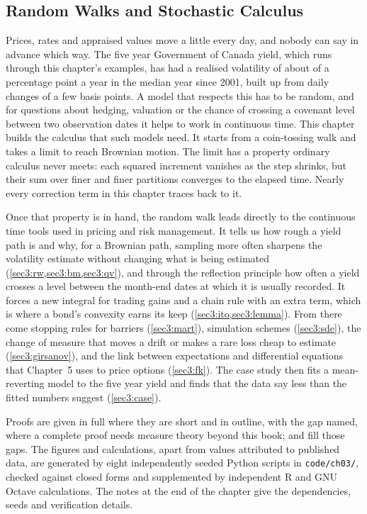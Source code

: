 
\begin{chapterrefs}
\setcounter{chapter}{2}
\chapter{Random Walks and Stochastic Calculus}
\label{ch:stochastic}

Prices, rates and appraised values move a little every day, and nobody can say in advance which way.
The five year Government of Canada yield, which runs through this chapter's examples, has had a
realised volatility of about \canRvDailyMed{} of a percentage point a year in the median year since
2001, built up from daily changes of a few basis points. A model that respects this has to be random, and for questions about hedging, valuation
or the chance of crossing a covenant level between two observation dates it helps to work in
continuous time. This chapter builds the calculus that such models need. It starts from a
coin-tossing walk and takes a limit to reach Brownian motion. The limit has a property ordinary
calculus never meets: each squared increment vanishes as the step shrinks, but their sum over finer
and finer partitions converges to the elapsed time. Nearly every correction term in this chapter traces back to it.

Once that property is in hand, the random walk leads directly to the continuous time tools used in pricing and risk management.
It tells us how rough a yield path is and why, for a Brownian path, sampling more often sharpens the
volatility estimate without changing what is being estimated
(\cref{sec3:rw,sec3:bm,sec3:qv}), and through the reflection principle how often a yield crosses a
level between the month-end dates at which it is usually recorded. It forces a new integral for trading gains and a chain rule with
an extra term, which is where a bond's convexity earns its keep (\cref{sec3:ito,sec3:lemma}). From
there come stopping rules for barriers (\cref{sec3:mart}), simulation schemes (\cref{sec3:sde}), the
change of measure that moves a drift or makes a rare loss cheap to estimate (\cref{sec3:girsanov}),
and the link between expectations and differential equations that Chapter~5 uses to price options
(\cref{sec3:fk}). The case study then fits a mean-reverting model to the five year yield and finds
that the data say less than the fitted numbers suggest (\cref{sec3:case}).

\begin{keybox}
Proofs are given in full where they are short and in outline, with the gap named, where a complete
proof needs measure theory beyond this book; \textcite{karatzas1998} and \textcite{morters2010} fill
those gaps. The figures and calculations, apart from values attributed to published data, are generated by eight
independently seeded Python scripts in \texttt{code/ch03/}, checked against closed forms and
supplemented by independent R and GNU Octave calculations. The notes at the end of the chapter give the
dependencies, seeds and verification details.
\end{keybox}

\end{chapterrefs}
